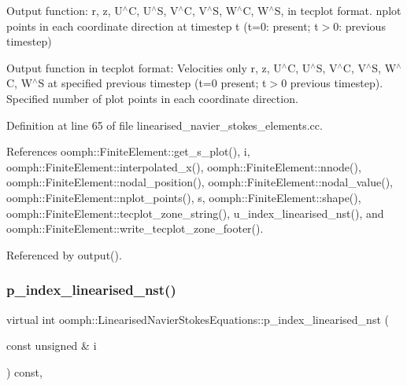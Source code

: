 Output function\+: r, z, U$^\wedge$C, U$^\wedge$S, V$^\wedge$C, V$^\wedge$S, W$^\wedge$C, W$^\wedge$S, in tecplot format. nplot points in each coordinate direction at timestep t (t=0\+: present; t$>$0\+: previous timestep) 

Output function in tecplot format\+: Velocities only r, z, U$^\wedge$C, U$^\wedge$S, V$^\wedge$C, V$^\wedge$S, W$^\wedge$C, W$^\wedge$S at specified previous timestep (t=0 present; t$>$0 previous timestep). Specified number of plot points in each coordinate direction. 

Definition at line 65 of file linearised\+\_\+navier\+\_\+stokes\+\_\+elements.\+cc.



References oomph\+::\+Finite\+Element\+::get\+\_\+s\+\_\+plot(), i, oomph\+::\+Finite\+Element\+::interpolated\+\_\+x(), oomph\+::\+Finite\+Element\+::nnode(), oomph\+::\+Finite\+Element\+::nodal\+\_\+position(), oomph\+::\+Finite\+Element\+::nodal\+\_\+value(), oomph\+::\+Finite\+Element\+::nplot\+\_\+points(), s, oomph\+::\+Finite\+Element\+::shape(), oomph\+::\+Finite\+Element\+::tecplot\+\_\+zone\+\_\+string(), u\+\_\+index\+\_\+linearised\+\_\+nst(), and oomph\+::\+Finite\+Element\+::write\+\_\+tecplot\+\_\+zone\+\_\+footer().



Referenced by output().

\mbox{\label{classoomph_1_1LinearisedNavierStokesEquations_ae27e5313386ad80524a5aae41a1e23e1}} 
\subsubsection{\texorpdfstring{p\+\_\+index\+\_\+linearised\+\_\+nst()}{p\_index\_linearised\_nst()}}
{\footnotesize\ttfamily virtual int oomph\+::\+Linearised\+Navier\+Stokes\+Equations\+::p\+\_\+index\+\_\+linearised\+\_\+nst (\begin{DoxyParamCaption}\item[{const unsigned \&}]{i }\end{DoxyParamCaption}) const\hspace{0.3cm}{\ttfamily [inline]}, {\ttfamily [virtual]}}




